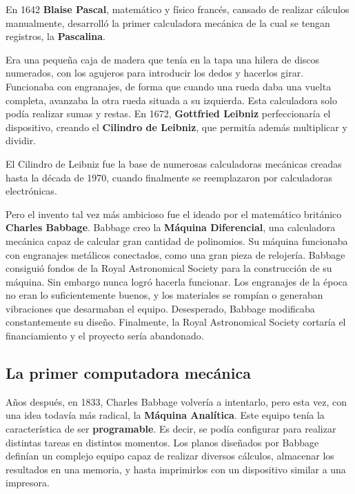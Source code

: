  En 1642 \textbf{Blaise Pascal},
matemático y físico francés, cansado de realizar cálculos manualmente,
desarrolló la primer calculadora mecánica de la cual se tengan registros, la
\textbf{Pascalina}.

 Era una pequeña caja de madera que tenía en la tapa una hilera de
discos numerados, con los agujeros para introducir los dedos y hacerlos girar.
Funcionaba con engranajes, de forma que cuando una rueda daba una vuelta
completa, avanzaba la otra rueda situada a su izquierda. Esta calculadora solo
podía realizar sumas y restas. En 1672, \textbf{Gottfried Leibniz}
perfeccionaría el dispositivo, creando el \textbf{Cilindro de Leibniz}, que
permitía además multiplicar y dividir.\autocite{chase_1980}

\begin{knowwhat}
    El Cilindro de Leibniz fue la base de numerosas calculadoras mecánicas
    creadas hasta la década de 1970, cuando finalmente se reemplazaron por
    calculadoras electrónicas.
\end{knowwhat}

 Pero el
invento tal vez más ambicioso fue el ideado por el matemático británico
\textbf{Charles Babbage}. Babbage creo la \textbf{Máquina Diferencial}, una
calculadora mecánica capaz de calcular gran cantidad de polinomios. Su máquina
funcionaba con engranajes metálicos conectados, como una gran pieza de
relojería. Babbage consiguió fondos de la Royal Astronomical Society para la
construcción de su máquina. Sin embargo nunca logró hacerla funcionar. Los
engranajes de la época no eran lo suficientemente buenos, y los materiales se
rompían o generaban vibraciones que desarmaban el equipo. Desesperado, Babbage
modificaba constantemente su diseño. Finalmente, la Royal Astronomical Society
cortaría el financiamiento y el proyecto sería abandonado.

\subsection{La primer computadora mecánica}
\label{chap:historia_computadoras:subsec:maquina_analitica}

 Años después,
en 1833, Charles Babbage volvería a intentarlo, pero esta vez, con una idea
todavía más radical, la \textbf{Máquina Analítica}. Este equipo tenía la
característica de ser \textbf{programable}. Es decir, se podía configurar para
realizar distintas tareas en distintos momentos. Los planos diseñados por
Babbage definían un complejo equipo capaz de realizar diversos cálculos,
almacenar los resultados en una memoria, y hasta imprimirlos con un dispositivo
similar a una impresora.\


